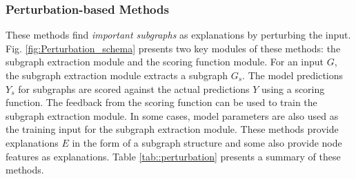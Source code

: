 \begin{table}[tb]
  \centering
  \caption{Key highlights of \textit{surrogate methods} }
  \label{tab::surrogate}%
\end{table}%













 \subsubsection{Perturbation-based Methods} 
 \label{sec::perturbation}
 These methods find \textit{important subgraphs} as explanations by perturbing the input. Fig. \ref{fig:Perturbation_schema} presents two key modules of these methods: the subgraph extraction module and the scoring function module. For an input \(G\), the subgraph extraction module extracts a subgraph \(G_s\). The model predictions \(Y_s\) for subgraphs are scored against the actual predictions \(Y\) using a scoring function. The feedback from the scoring function can be used to train the subgraph extraction module. In some cases, model parameters are also used as the training input for the subgraph extraction module. These methods provide explanations \(E\) in the form of a subgraph structure and some also provide node features as explanations. Table \ref{tab::perturbation} presents a summary of these methods.

